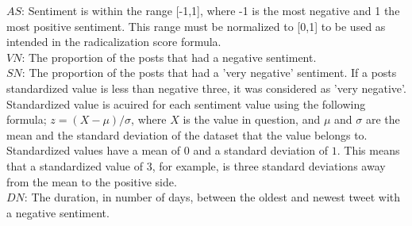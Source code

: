 \documentclass[conference]{IEEEtran}
\begin{document}
\(AS\): Sentiment is within the range [-1,1], where -1 is the most negative and 1 the most positive sentiment.
 This range must be normalized to [0,1] to be used as intended in the radicalization score formula.\\ %
\(VN\): The proportion of the posts that had a negative sentiment.\\
\(SN\): The proportion of the posts that had a 'very negative' sentiment. If a posts standardized value is less than negative three, it was considered as 'very negative'.
Standardized value is acuired for each sentiment value using the following formula;
\(z = (X - \mu)/\sigma\), where \(X\) is the value in question, and \(\mu\) and \(\sigma\) are the mean and the standard deviation of the dataset that the value belongs to. Standardized values have a mean of \(0\) and a standard deviation of \(1\). This means that a standardized value of 3, for example, is three standard deviations away from the mean to the positive side.\\
\(DN\): The duration, in number of days, between the oldest and newest tweet with a negative sentiment. \\
\\
\end{document}
